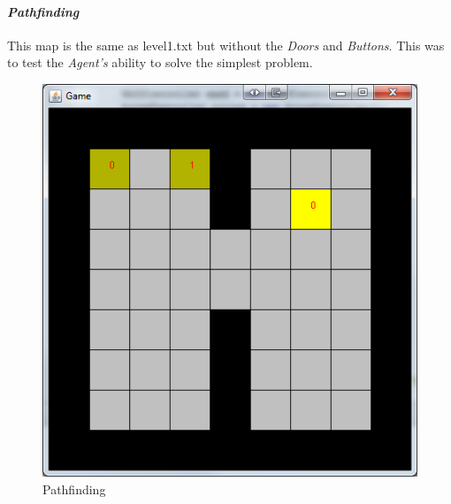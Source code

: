 \documentclass{IEEEtran}
\begin{document}
\paragraph{\emph{Pathfinding}} This map is the same as level1.txt but without the \emph{Doors} and \emph{Buttons}. This was to test the \emph{Agent's} ability to solve the simplest problem.
\begin{figure}[H]
\centering
\includegraphics[scale=0.35]{level1e}
\caption{Pathfinding}
\label{Pathfinding}
\end{figure}
\end{document}
